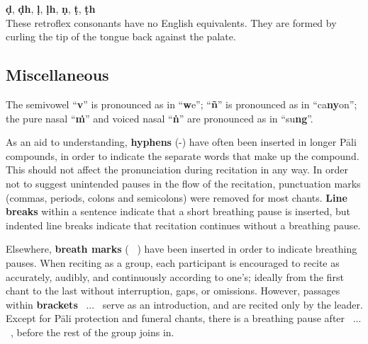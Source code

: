 \begin{justify}
  \textbf{ḍ}, \textbf{ḍh}, \textbf{ḷ}, \textbf{ḷh}, \textbf{ṇ}, \textbf{ṭ}, \textbf{ṭh}\\
  These retroflex consonants have no English equivalents. They are formed by curling the tip of the tongue back against the palate.
\end{justify}

\clearpage

\subsection*{Miscellaneous}
\begin{justify}
  The semivowel ``\textbf{v}'' is pronounced as in ``\textbf{w}e''; ``\textbf{ñ}'' is pronounced as in ``ca\textbf{ny}on''; the pure nasal ``\textbf{ṁ}'' and voiced nasal ``\textbf{ṅ}'' are pronounced as in ``su\textbf{ng}''.
\end{justify}

\begin{justify}
  As an aid to understanding, \textbf{hyphens} (-) have often been inserted in longer Pāli compounds, in order to indicate the separate words that make up the compound. This should not affect the pronunciation during recitation in any way. In order not to suggest unintended pauses in the flow of the recitation, punctuation marks (commas, periods, colons and semicolons) were removed for most chants. \textbf{Line breaks} within a sentence indicate that a short breathing pause is inserted, but indented line breaks indicate that recitation continues without a breathing pause.
\end{justify}

\begin{justify}
  Elsewhere, \textbf{breath marks} ( \abbrbreathmark\ ) have been inserted in order to indicate breathing pauses. When reciting as a group, each participant is encouraged to recite as accurately, audibly, and continuously according to one's; ideally from the first chant to the last without interruption, gaps, or omissions. However, passages within \textbf{brackets} \anglebracketleft\ \hspace{-0.5mm}... \hspace{-0.8mm}\anglebracketright\ serve as an introduction, and are recited only by the leader. Except for Pāli protection and funeral chants, there is a breathing pause after \anglebracketleft\ \hspace{-0.5mm}... \hspace{-0.8mm}\anglebracketright\ , before the rest of the group joins in.
\end{justify}

\clearpage
